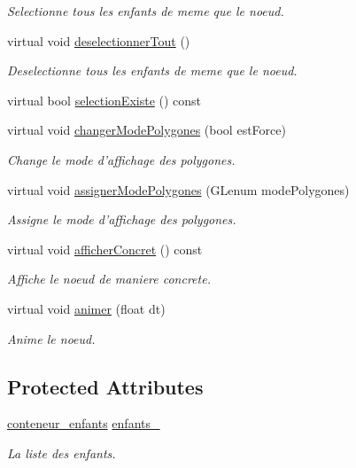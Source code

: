 \begin{DoxyCompactItemize}
\begin{DoxyCompactList}\small\item\em Selectionne tous les enfants de meme que le noeud. \end{DoxyCompactList}\item 
virtual void \hyperlink{group__inf2990_ga0a838e8f0a086e71856e3a116508bcf2}{deselectionner\-Tout} ()
\begin{DoxyCompactList}\small\item\em Deselectionne tous les enfants de meme que le noeud. \end{DoxyCompactList}\item 
virtual bool \hyperlink{group__inf2990_ga38f910a0d19bb3d091daa285ad91cd8a}{selection\-Existe} () const 
\item 
virtual void \hyperlink{group__inf2990_gafcbaa01f832fc2dad13b363253963d0b}{changer\-Mode\-Polygones} (bool est\-Force)
\begin{DoxyCompactList}\small\item\em Change le mode d'affichage des polygones. \end{DoxyCompactList}\item 
virtual void \hyperlink{group__inf2990_gaeeeca055ef6aef0435b9956eb467ff7f}{assigner\-Mode\-Polygones} (G\-Lenum mode\-Polygones)
\begin{DoxyCompactList}\small\item\em Assigne le mode d'affichage des polygones. \end{DoxyCompactList}\item 
virtual void \hyperlink{group__inf2990_gad440d00734a92e1bd99cdee2ac62bb68}{afficher\-Concret} () const 
\begin{DoxyCompactList}\small\item\em Affiche le noeud de maniere concrete. \end{DoxyCompactList}\item 
virtual void \hyperlink{group__inf2990_ga57f31e1a0fd79628d04651001014fd41}{animer} (float dt)
\begin{DoxyCompactList}\small\item\em Anime le noeud. \end{DoxyCompactList}\end{DoxyCompactItemize}
\subsection*{Protected Attributes}
\begin{DoxyCompactItemize}
\item 
\hypertarget{class_noeud_composite_a628227fd324020e497ada7577457ff3f}{\hyperlink{class_noeud_composite_a697e52516e154d6943a1e1aa9533c317}{conteneur\-\_\-enfants} \hyperlink{class_noeud_composite_a628227fd324020e497ada7577457ff3f}{enfants\-\_\-}}\label{class_noeud_composite_a628227fd324020e497ada7577457ff3f}

\begin{DoxyCompactList}\small\item\em La liste des enfants. \end{DoxyCompactList}\end{DoxyCompactItemize}

